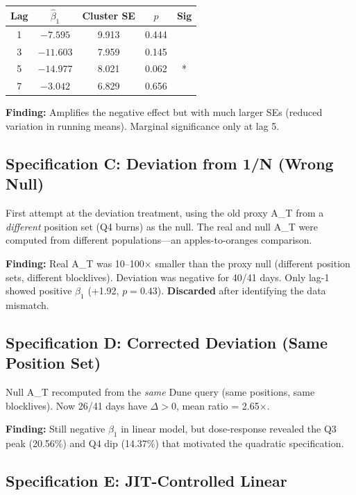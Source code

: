 \documentclass[11pt,a4paper]{article}
\begin{document}
\begin{center}
\begin{tabular}{ccccc}
\toprule
Lag & $\hat\beta_1$ & Cluster SE & $p$ & Sig \\
\midrule
1 & $-7.595$ & 9.913 & 0.444 & \\
3 & $-11.603$ & 7.959 & 0.145 & \\
5 & $-14.977$ & 8.021 & 0.062 & * \\
7 & $-3.042$ & 6.829 & 0.656 & \\
\bottomrule
\end{tabular}
\end{center}

\textbf{Finding:} Amplifies the negative effect but with much larger SEs
(reduced variation in running means). Marginal significance only at lag 5.

\subsection{Specification C: Deviation from 1/N (Wrong Null)}

First attempt at the deviation treatment, using the old proxy A\_T from a
\emph{different} position set (Q4 burns) as the null. The real and null
A\_T were computed from different populations---an apples-to-oranges
comparison.

\textbf{Finding:} Real A\_T was 10--100$\times$ smaller than the proxy null
(different position sets, different blocklives). Deviation was negative for
40/41 days. Only lag-1 showed positive $\beta_1$ (+1.92, $p = 0.43$).
\textbf{Discarded} after identifying the data mismatch.

\subsection{Specification D: Corrected Deviation (Same Position Set)}

Null A\_T recomputed from the \emph{same} Dune query (same positions, same
blocklives). Now 26/41 days have $\Delta > 0$, mean ratio = 2.65$\times$.

\textbf{Finding:} Still negative $\beta_1$ in linear model, but
dose-response revealed the Q3 peak (20.56\%) and Q4 dip (14.37\%) that
motivated the quadratic specification.

\subsection{Specification E: JIT-Controlled Linear}
\end{document}
